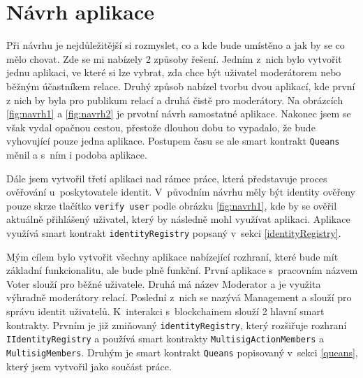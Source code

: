 \section{Návrh aplikace}
Při návrhu je nejdůležitější si rozmyslet, co a kde bude umístěno a jak by se co mělo chovat. Zde se mi nabízely 2 způsoby řešení. Jedním z~nich bylo vytvořit jednu aplikaci, ve které si lze vybrat, zda chce být uživatel moderátorem nebo běžným účastníkem relace. Druhý způsob nabízel tvorbu dvou aplikací, kde první z nich by byla pro publikum relací a druhá čistě pro moderátory. Na obrázcích \ref{fig:navrh1} a \ref{fig:navrh2} je prvotní návrh samostatné aplikace. Nakonec jsem se však vydal opačnou cestou, přestože dlouhou dobu to vypadalo, že bude vyhovující pouze jedna aplikace. Postupem času se ale smart kontrakt \texttt{Queans} měnil a s~ním i podoba aplikace. 

Dále jsem vytvořil třetí aplikaci nad rámec práce, která představuje proces ověřování u~poskytovatele identit. V~původním návrhu měly být identity ověřeny pouze skrze tlačítko \texttt{verify user} podle obrázku \ref{fig:navrh1}, kde by se ověřil aktuálně přihlášený uživatel, který by následně mohl využívat aplikaci. Aplikace využívá smart kontrakt \texttt{identityRegistry} popsaný v~sekci \ref{identityRegistry}.

Mým cílem bylo vytvořit všechny aplikace nabízející rozhraní, které bude mít základní funkcionalitu, ale bude plně funkční. První aplikace s~pracovním názvem Voter slouží pro běžné uživatele. Druhá má název Moderator a je využita výhradně moderátory relací. Poslední z~nich se nazývá Management a slouží pro správu identit uživatelů.
K~interakci s~blockchainem slouží 2 hlavní smart kontrakty. Prvním je již zmiňovaný \texttt{identityRegistry}, který rozšiřuje rozhraní \texttt{IIdentityRegistry} a používá smart kontrakty \texttt{MultisigAction\-Members} a \texttt{MultisigMembers}. Druhým je smart kontrakt \texttt{Queans} popisovaný v~sekci \ref{queans}, který jsem vytvořil jako součást práce. 

